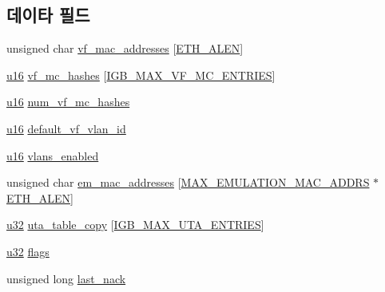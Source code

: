 \subsection*{데이타 필드}
\begin{DoxyCompactItemize}
\item 
unsigned char \hyperlink{structvf__data__storage_af8b31ab04432231145129c4cf97564d7}{vf\+\_\+mac\+\_\+addresses} \mbox{[}\hyperlink{avb__avtp_8h_a9822d89774e0d6ddaa06503950130423}{E\+T\+H\+\_\+\+A\+L\+EN}\mbox{]}
\item 
\hyperlink{lib_2igb_2e1000__osdep_8h_acdc9cf0314be0ae5a01d6d4379a95edd}{u16} \hyperlink{structvf__data__storage_af90ca0822ec7563ef8e81a5ae4c0dea9}{vf\+\_\+mc\+\_\+hashes} \mbox{[}\hyperlink{kmod_2igb_2igb_8h_ace0a373b1ff7f96f8685d15fa554f829}{I\+G\+B\+\_\+\+M\+A\+X\+\_\+\+V\+F\+\_\+\+M\+C\+\_\+\+E\+N\+T\+R\+I\+ES}\mbox{]}
\item 
\hyperlink{lib_2igb_2e1000__osdep_8h_acdc9cf0314be0ae5a01d6d4379a95edd}{u16} \hyperlink{structvf__data__storage_aff1c125b9a16972a063c1983a1c1ad16}{num\+\_\+vf\+\_\+mc\+\_\+hashes}
\item 
\hyperlink{lib_2igb_2e1000__osdep_8h_acdc9cf0314be0ae5a01d6d4379a95edd}{u16} \hyperlink{structvf__data__storage_a3ffe091a80e7d63d253ce588d78352db}{default\+\_\+vf\+\_\+vlan\+\_\+id}
\item 
\hyperlink{lib_2igb_2e1000__osdep_8h_acdc9cf0314be0ae5a01d6d4379a95edd}{u16} \hyperlink{structvf__data__storage_aaacbf33baac1c57aa21691925b0223c2}{vlans\+\_\+enabled}
\item 
unsigned char \hyperlink{structvf__data__storage_a3f40032bc94d99aa94137769c46abfed}{em\+\_\+mac\+\_\+addresses} \mbox{[}\hyperlink{kmod_2igb_2igb_8h_ab1daf74adae9c9db3cca732cf57b43dd}{M\+A\+X\+\_\+\+E\+M\+U\+L\+A\+T\+I\+O\+N\+\_\+\+M\+A\+C\+\_\+\+A\+D\+D\+RS} $\ast$\hyperlink{avb__avtp_8h_a9822d89774e0d6ddaa06503950130423}{E\+T\+H\+\_\+\+A\+L\+EN}\mbox{]}
\item 
\hyperlink{lib_2igb_2e1000__osdep_8h_a64e91c10a0d8fb627e92932050284264}{u32} \hyperlink{structvf__data__storage_a5122b8f0d879b55c5e58e871c161a95b}{uta\+\_\+table\+\_\+copy} \mbox{[}\hyperlink{kmod_2igb_2igb_8h_a01acb4f5fb822289fd14415010087a87}{I\+G\+B\+\_\+\+M\+A\+X\+\_\+\+U\+T\+A\+\_\+\+E\+N\+T\+R\+I\+ES}\mbox{]}
\item 
\hyperlink{lib_2igb_2e1000__osdep_8h_a64e91c10a0d8fb627e92932050284264}{u32} \hyperlink{structvf__data__storage_a9fb2abd9f2594cefc48d6856e01f2879}{flags}
\item 
unsigned long \hyperlink{structvf__data__storage_a2c046c18bb826921deb58929924410c3}{last\+\_\+nack}
\end{DoxyCompactItemize}



